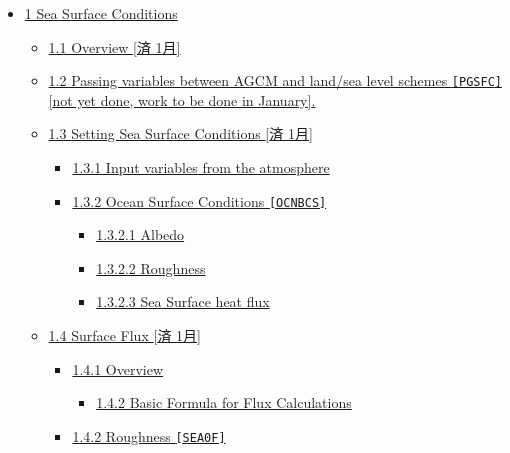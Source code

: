 \begin{itemize}
\tightlist
\item
  \protect\hyperlink{1-sea-surface-conditions}{1 Sea Surface Conditions}

  \begin{itemize}
  \tightlist
  \item
    \protect\hyperlink{11-overview-ux6e08-1ux6708}{1.1 Overview {[}済
    1月{]}}
  \item
    \protect\hyperlink{12-passing-variables-between-agcm-and-landsea-level-schemes-pgsfcnot-yet-done-work-to-be-done-in-january}{1.2
    Passing variables between AGCM and land/sea level schemes
    \texttt{{[}PGSFC{]}}{[}not yet done, work to be done in January{]}.}
  \item
    \protect\hyperlink{13-setting-sea-surface-conditions-ux6e08-1ux6708}{1.3
    Setting Sea Surface Conditions {[}済 1月{]}}

    \begin{itemize}
    \tightlist
    \item
      \protect\hyperlink{131-input-variables-from-the-atmosphere}{1.3.1
      Input variables from the atmosphere}
    \item
      \protect\hyperlink{132-ocean-surface-conditions-ocnbcs}{1.3.2
      Ocean Surface Conditions \texttt{{[}OCNBCS{]}}}

      \begin{itemize}
      \tightlist
      \item
        \protect\hyperlink{1321-albedo}{1.3.2.1 Albedo}
      \item
        \protect\hyperlink{1322-roughness}{1.3.2.2 Roughness}
      \item
        \protect\hyperlink{1323-sea-surface-heat-flux}{1.3.2.3 Sea
        Surface heat flux}
      \end{itemize}
    \end{itemize}
  \item
    \protect\hyperlink{14-surface-flux-ux6e08-1ux6708}{1.4 Surface Flux
    {[}済 1月{]}}

    \begin{itemize}
    \tightlist
    \item
      \protect\hyperlink{141-overview}{1.4.1 Overview}

      \begin{itemize}
      \tightlist
      \item
        \protect\hyperlink{142-basic-formula-for-flux-calculations}{1.4.2
        Basic Formula for Flux Calculations}
      \end{itemize}
    \item
      \protect\hyperlink{142-roughness-sea0f}{1.4.2 Roughness
      \texttt{{[}SEA0F{]}}}


\end{itemize}
\end{itemize}
\end{itemize}
